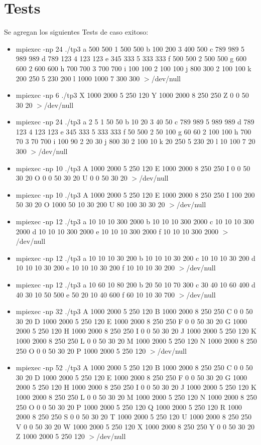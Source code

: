 \section{Tests}
Se agregan los siguientes Tests de caso exitoso:
\begin{itemize}
\item mpiexec -np 24 ./tp3  a 500 500 1 500 500 b 100 200 3 400 500 c 789 989 5 989 989 d 789 123 4 123 123 e 345 333 5 333 333 f 500 500 2 500 500 g 600 600 2 600 600 h 700 700 3 700 700 i 100 100 2 100 100 j 800 300 2 100 100 k 200 250 5 230 200 l 1000 1000 7 300 300 $>$/dev/null 
\item mpiexec -np 6 ./tp3  X 1000 2000 5 250 120 Y 1000 2000 8 250 250 Z 0 0 50 30 20 $>$/dev/null
\item mpiexec -np 24 ./tp3  a 2 5 1 50 50 b 10 20 3 40 50 c 789 989 5 989 989 d 789 123 4 123 123 e 345 333 5 333 333 f 50 500 2 50 100 g 60 60 2 100 100 h 700 70 3 70 700 i 100 90 2 20 30 j 800 30 2 100 10 k 20 250 5 230 20 l 10 100 7 20 300 $>$/dev/null
\item mpiexec -np 10 ./tp3  A 1000 2000 5 250 120 E 1000 2000 8 250 250 I 0 0 50 30 20 O 0 0 50 30 20 U 0 0 50 30 20 $>$/dev/null
\item mpiexec -np 10 ./tp3  A 1000 2000 5 250 120 E 1000 2000 8 250 250 I 100 200 50 30 20 O 1000 50 10 30 200 U 80 100 30 30 20 $>$/dev/null
\item mpiexec -np 12 ./tp3  a 10 10 10 300 2000 b 10 10 10 300 2000 c 10 10 10 300 2000 d 10 10 10 300 2000 e 10 10 10 300 2000 f 10 10 10 300 2000 $>$/dev/null
\item mpiexec -np 12 ./tp3  a 10 10 10 30 200 b 10 10 10 30 200 c 10 10 10 30 200 d 10 10 10 30 200 e 10 10 10 30 200 f 10 10 10 30 200 $>$/dev/null
\item mpiexec -np 12 ./tp3  a 10 60 10 80 200 b 20 50 10 70 300 c 30 40 10 60 400 d 40 30 10 50 500 e 50 20 10 40 600 f 60 10 10 30 700 $>$/dev/null
\item mpiexec -np 32 ./tp3  A 1000 2000 5 250 120 B 1000 2000 8 250 250 C 0 0 50 30 20 D 1000 2000 5 250 120 E 1000 2000 8 250 250 F 0 0 50 30 20 G 1000 2000 5 250 120 H 1000 2000 8 250 250 I 0 0 50 30 20 J 1000 2000 5 250 120 K 1000 2000 8 250 250 L 0 0 50 30 20 M 1000 2000 5 250 120 N 1000 2000 8 250 250 O 0 0 50 30 20 P 1000 2000 5 250 120 $>$/dev/null
\item mpiexec -np 52 ./tp3  A 1000 2000 5 250 120 B 1000 2000 8 250 250 C 0 0 50 30 20 D 1000 2000 5 250 120 E 1000 2000 8 250 250 F 0 0 50 30 20 G 1000 2000 5 250 120 H 1000 2000 8 250 250 I 0 0 50 30 20 J 1000 2000 5 250 120 K 1000 2000 8 250 250 L 0 0 50 30 20 M 1000 2000 5 250 120 N 1000 2000 8 250 250 O 0 0 50 30 20 P 1000 2000 5 250 120 Q 1000 2000 5 250 120 R 1000 2000 8 250 250 S 0 0 50 30 20 T 1000 2000 5 250 120 U 1000 2000 8 250 250 V 0 0 50 30 20 W 1000 2000 5 250 120 X 1000 2000 8 250 250 Y 0 0 50 30 20 Z 1000 2000 5 250 120 $>$/dev/null
\end{itemize}
